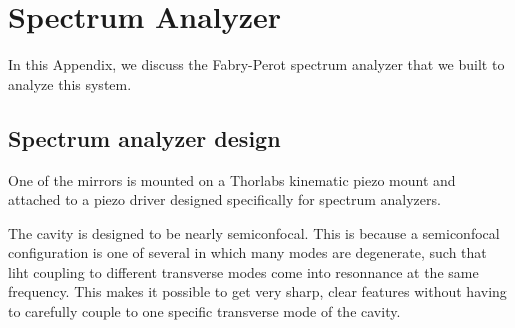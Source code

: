 \chapter{Spectrum Analyzer}
\label{Spectrum Analyzer}





In this Appendix, we discuss the Fabry-Perot spectrum analyzer that we built to analyze this system. 


\section{Spectrum analyzer design}
One of the mirrors is mounted on a Thorlabs kinematic piezo mount and attached to a piezo driver designed specifically for spectrum analyzers.

The cavity is designed to be nearly semiconfocal.%
This is because a semiconfocal configuration is one of several in which many modes are degenerate, such that liht coupling to different transverse modes come into resonnance at the same frequency. This makes it possible to get very sharp, clear features without having to carefully couple to one specific transverse mode of the cavity. 


